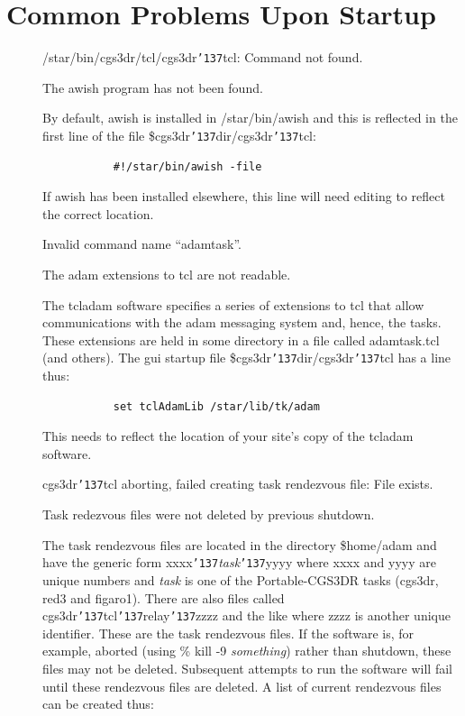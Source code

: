 \documentclass[a4paper]{book}
\renewcommand{\_}{{\tt\char'137}}
\begin{document}
\section{Common Problems Upon Startup}
\begin{description}
\item[] {\sf /star/bin/cgs3dr/tcl/cgs3dr\_tcl: Command not found.} 

  The awish program has not been found.

  By default, awish is installed in /star/bin/awish and this is reflected
  in the first line of the file {\sc \$cgs3dr\_dir}/cgs3dr\_tcl:
  \begin{verbatim}
           #!/star/bin/awish -file
  \end{verbatim}
  If awish has been installed elsewhere, this line will need editing to reflect 
  the correct location.

\item[] {\sf Invalid command name ``adamtask''.}

  The {\sc adam} extensions to tcl are not readable. 

  The {\sc tcladam} software specifies a series of extensions to tcl that allow
  communications with the {\sc adam} messaging system and, hence, the tasks. These
  extensions are held in some directory in a file called adamtask.tcl (and others).
  The {\sc gui} startup file {\sc \$cgs3dr\_dir}/cgs3dr\_tcl has a line thus:
  \begin{verbatim}
           set tclAdamLib /star/lib/tk/adam
  \end{verbatim}
  This needs to reflect the location of your site's copy of the {\sc tcladam} software.

\item[] {\sf cgs3dr\_tcl aborting, failed creating task rendezvous file: File exists.}

  Task redezvous files were not deleted by previous shutdown.

  The task rendezvous files are located in the directory {\sc \$home}/adam and have the generic form 
  {\sf xxxx}\_{\em task}\_{\sf yyyy} where {\sf xxxx} and {\sf yyyy} are unique numbers
  and {\em task} is one of the Portable-CGS3DR tasks (cgs3dr, red3 and figaro1).
  There are also files called cgs3dr\_tcl\_relay\_{\sf zzzz} and the like where {\sf zzzz}
  is another unique identifier. These are the task rendezvous files. If the software is, 
  for example, aborted (using \% kill -9 {\em something}) rather than shutdown, these files may not be deleted.
  Subsequent attempts to run the software will fail until these rendezvous files are
  deleted. A list of current rendezvous files can be created thus:


\end{description}
\end{document}
